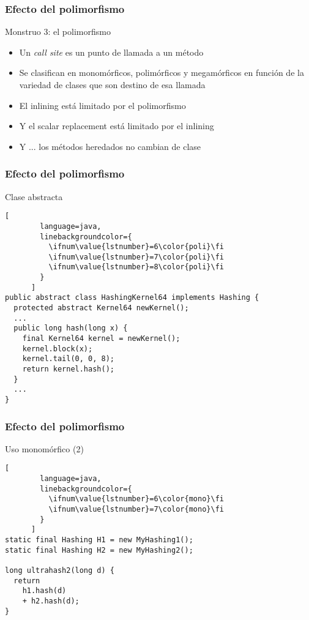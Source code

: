 
\def\ft{Efecto del polimorfismo}

\begin{frame}[fragile]
  \frametitle{\ft}
  \begin{block}{Monstruo 3: el polimorfismo}
    \begin{itemize}
    \item Un {\it call site} es un punto de llamada a un método
    \item Se clasifican en monomórficos, polimórficos y megamórficos
      en función de la variedad de clases que son destino de esa llamada
    \item El inlining está limitado por el polimorfismo
    \item Y el scalar replacement está limitado por el inlining
    \item Y ... los métodos heredados no cambian de clase
    \end{itemize}
  \end{block}
\end{frame}


\begin{frame}[fragile]
  \frametitle{\ft}
  \begin{block}{Clase abstracta}
    \begin{lstlisting}[
        language=java,
        linebackgroundcolor={
          \ifnum\value{lstnumber}=6\color{poli}\fi
          \ifnum\value{lstnumber}=7\color{poli}\fi
          \ifnum\value{lstnumber}=8\color{poli}\fi
        }
      ]
public abstract class HashingKernel64 implements Hashing {
  protected abstract Kernel64 newKernel();
  ...
  public long hash(long x) {
    final Kernel64 kernel = newKernel();
    kernel.block(x);
    kernel.tail(0, 0, 8);
    return kernel.hash();
  }
  ...
}
    \end{lstlisting}
  \end{block}
\end{frame}


\begin{frame}[fragile]
  \frametitle{\ft}
  \begin{block}{Uso monomórfico (2)}
    \begin{lstlisting}[
        language=java,
        linebackgroundcolor={
          \ifnum\value{lstnumber}=6\color{mono}\fi
          \ifnum\value{lstnumber}=7\color{mono}\fi
        }
      ]
static final Hashing H1 = new MyHashing1();
static final Hashing H2 = new MyHashing2();

long ultrahash2(long d) {
  return
    h1.hash(d)
    + h2.hash(d);
}
    \end{lstlisting}
  \end{block}
\end{frame}


